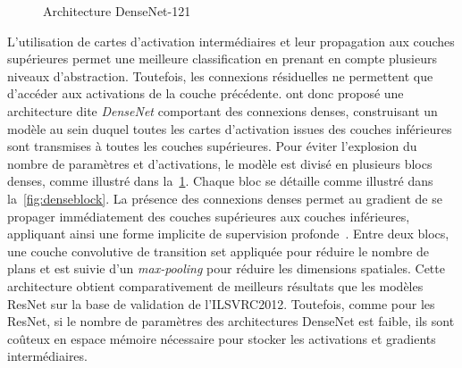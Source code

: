 \begin{figure}[t]
  \resizebox{\textwidth}{!}{
    
  }
  \caption{Architecture DenseNet-121~\cite{huang_densely_2017}}
  \label{fig:densenet}
\end{figure}


L'utilisation de cartes d'activation intermédiaires et leur propagation aux couches supérieures permet une meilleure classification en prenant en compte plusieurs niveaux d'abstraction. Toutefois, les connexions résiduelles ne permettent que d'accéder aux activations de la couche précédente. \citet{huang_densely_2017} ont donc proposé une architecture dite \emph{DenseNet} comportant des connexions denses, construisant un modèle au sein duquel toutes les cartes d'activation issues des couches inférieures sont transmises à toutes les couches supérieures. Pour éviter l'explosion du nombre de paramètres et d'activations, le modèle est divisé en plusieurs blocs denses, comme illustré dans la~\cref{fig:densenet}. Chaque bloc se détaille comme illustré dans la~\cref{fig:denseblock}. La présence des connexions denses permet au gradient de se propager immédiatement des couches supérieures aux couches inférieures, appliquant ainsi une forme implicite de supervision profonde~\cite{lee_deeply-supervised_2015}. Entre deux blocs, une couche convolutive de transition set appliquée pour réduire le nombre de plans et est suivie d'un \emph{max-pooling} pour réduire les dimensions spatiales. Cette architecture obtient comparativement de meilleurs résultats que les modèles ResNet sur la base de validation de l'\gls{ILSVRC}2012. Toutefois, comme pour les ResNet, si le nombre de paramètres des architectures DenseNet est faible, ils sont coûteux en espace mémoire nécessaire pour stocker les activations et gradients intermédiaires.



